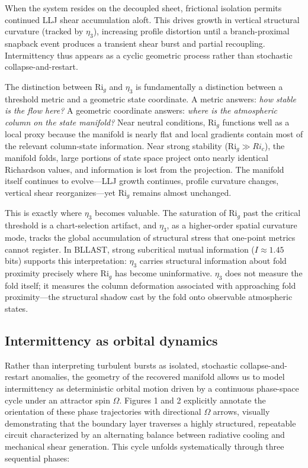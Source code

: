 \documentclass[12pt,a4paper]{article}
\newcommand{\Rig}{\mathrm{Ri}_g}
\begin{document}
When the system resides on the decoupled sheet, frictional isolation permits continued LLJ shear accumulation aloft. This drives growth in vertical structural curvature (tracked by $\eta_3$), increasing profile distortion until a branch-proximal snapback event produces a transient shear burst and partial recoupling. Intermittency thus appears as a cyclic geometric process rather than stochastic collapse-and-restart.

The distinction between $\Rig$ and $\eta_3$ is fundamentally a distinction between a threshold metric and a geometric state coordinate. A metric answers: \emph{how stable is the flow here?} A geometric coordinate answers: \emph{where is the atmospheric column on the state manifold?} Near neutral conditions, $\Rig$ functions well as a local proxy because the manifold is nearly flat and local gradients contain most of the relevant column-state information. Near strong stability ($\Rig \gg Ri_c$), the manifold folds, large portions of state space project onto nearly identical Richardson values, and information is lost from the projection. The manifold itself continues to evolve---LLJ growth continues, profile curvature changes, vertical shear reorganizes---yet $\Rig$ remains almost unchanged.

This is exactly where $\eta_3$ becomes valuable. The saturation of $\Rig$ past the critical threshold is a chart-selection artifact, and $\eta_3$, as a higher-order spatial curvature mode, tracks the global accumulation of structural stress that one-point metrics cannot register. In BLLAST, strong subcritical mutual information ($I \approx 1.45$ bits) supports this interpretation: $\eta_3$ carries structural information about fold proximity precisely where $\Rig$ has become uninformative. $\eta_3$ does not measure the fold itself; it measures the column deformation associated with approaching fold proximity---the structural shadow cast by the fold onto observable atmospheric states.

\subsection{Intermittency as orbital dynamics}

Rather than interpreting turbulent bursts as isolated, stochastic collapse-and-restart anomalies, the geometry of the recovered manifold allows us to model intermittency as deterministic orbital motion driven by a continuous phase-space cycle under an attractor spin $\Omega$. Figures 1 and 2 explicitly annotate the orientation of these phase trajectories with directional $\Omega$ arrows, visually demonstrating that the boundary layer traverses a highly structured, repeatable circuit characterized by an alternating balance between radiative cooling and mechanical shear generation. This cycle unfolds systematically through three sequential phases:
\end{document}
